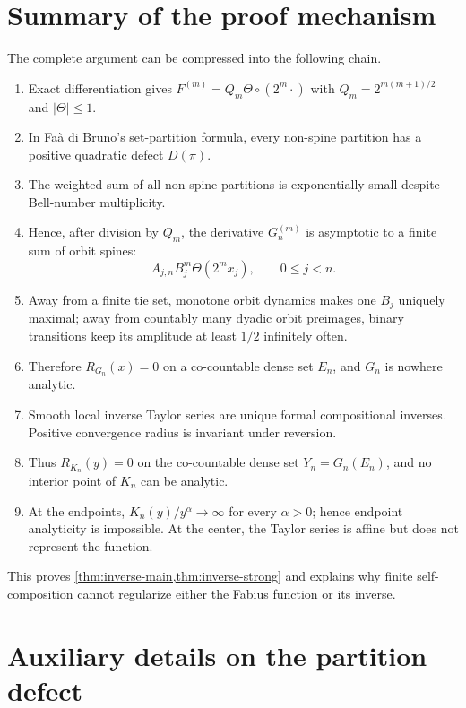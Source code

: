 \documentclass[11pt,oneside]{article}
\theoremstyle{definition}
\theoremstyle{remark}
\newcommand{\comp}{\mathbin{\circ}}
\begin{document}
\section{Summary of the proof mechanism}

The complete argument can be compressed into the following chain.
\begin{enumerate}[label=\arabic*.]
 \item Exact differentiation gives
 $F^{(m)}=Q_m\Theta\comp(2^m\cdot)$ with
 $Q_m=2^{m(m+1)/2}$ and $|\Theta|\leq1$.
 \item In Fa\`a di Bruno's set-partition formula, every non-spine partition has a
 positive quadratic defect $D(\pi)$.
 \item The weighted sum of all non-spine partitions is exponentially small despite
 Bell-number multiplicity.
 \item Hence, after division by $Q_m$, the derivative $G_n^{(m)}$ is asymptotic to a
 finite sum of orbit spines:
 \
 \[
   A_{j,n}B_j^m\Theta(2^m x_j),\qquad 0\leq j<n.
 \]
 \item Away from a finite tie set, monotone orbit dynamics makes one $B_j$ uniquely
 maximal; away from countably many dyadic orbit preimages, binary transitions keep its
 amplitude at least $1/2$ infinitely often.
 \item Therefore $R_{G_n}(x)=0$ on a co-countable dense set $E_n$, and $G_n$ is nowhere
 analytic.
 \item Smooth local inverse Taylor series are unique formal compositional inverses.
 Positive convergence radius is invariant under reversion.
 \item Thus $R_{K_n}(y)=0$ on the co-countable dense set $Y_n=G_n(E_n)$, and no interior
 point of $K_n$ can be analytic.
 \item At the endpoints, $K_n(y)/y^\alpha\to\infty$ for every $\alpha>0$; hence endpoint
 analyticity is impossible.  At the center, the Taylor series is affine but does not
 represent the function.
\end{enumerate}
This proves \cref{thm:inverse-main,thm:inverse-strong} and explains why finite
self-composition cannot regularize either the Fabius function or its inverse.

\appendix

\section{Auxiliary details on the partition defect}
\label{app:defect}
\end{document}
